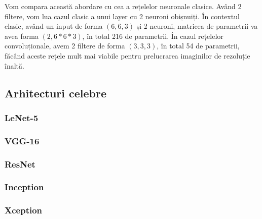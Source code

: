 Vom compara această abordare cu cea a rețelelor neuronale clasice. Având 2 filtere, vom lua cazul clasic a unui layer cu 2 neuroni obișnuiți. În contextul clasic, având un input de forma $(6,6,3)$ și 2 neuroni, matricea de parametrii va avea forma $(2,6*6*3)$, în total 216 de parametrii. În cazul rețelelor convoluționale, avem 2 filtere de forma $(3,3,3)$, în total 54 de parametrii, făcând aceste rețele mult mai viabile pentru prelucrarea imaginilor de rezoluție înaltă.

\subsection{Arhitecturi celebre}

\subsubsection{LeNet-5}

\subsubsection{VGG-16}

\subsubsection{ResNet}

\subsubsection{Inception}

\subsubsection{Xception}

